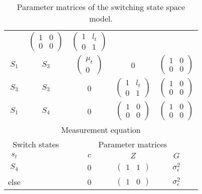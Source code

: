 \documentclass[12pt]{article}
\begin{document}
\begin{table}[h!]
\begin{tabular}[h!]{cc|ccc}
                                    & $\begin{pmatrix} 1 & 0 \\ 0 &
                                      0 \end{pmatrix}$ 
          & $\begin{pmatrix} 1 & l_t\\ 0 & 1 \end{pmatrix}$\\
  $S_1$ & $S_3$ & $\begin{pmatrix} \mu_t\\0\end{pmatrix}$ & 0
          & $\begin{pmatrix} 1 & 0\\ 0 & 0 \end{pmatrix}$\\
  $S_3$ & $S_3$ & 0& $\begin{pmatrix} 1 & l_t \\ 0 & 1 \end{pmatrix}$ 
        & $\begin{pmatrix}1&0\\0&0\end{pmatrix}$\\
  $S_1$ &  $S_4$ & 0 & $\begin{pmatrix}1&0\\0&0\end{pmatrix}$ 
        & $\begin{pmatrix}1&0\\0&0\end{pmatrix}$\\
  \hline\hline
  \multicolumn{5}{c}{Measurement equation}\\
  \hline
  \multicolumn{2}{c|}{Switch states} & \multicolumn{3}{c}{Parameter
                                      matrices}\\
  $s_t$ && $c$ & $Z$ & $G$\\
  \hline
  $S_4$ & & 0 & $\begin{pmatrix} 1 & 1 \end{pmatrix}$ &
                                                                  $\sigma^2_\epsilon$\\
  else && 0 & $\begin{pmatrix} 1 & 0 \end{pmatrix}$ &
                                                                  $\sigma^2_\epsilon$\\
  \hline\hline
\end{tabular}
\caption{Parameter matrices of the switching state space model.\label{tab:parmats}}
\end{table}
\end{document}
